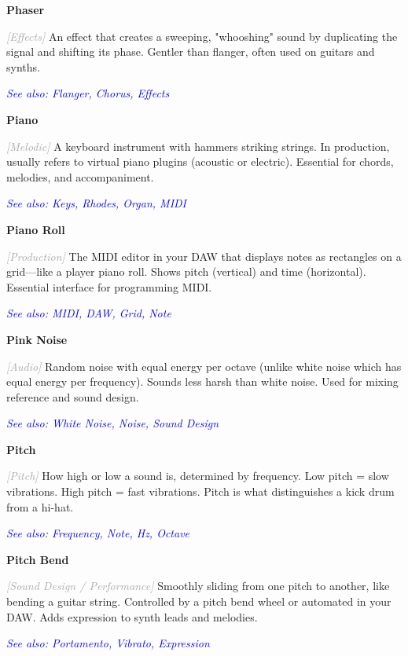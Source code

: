 \documentclass[11pt,letterpaper]{article}
\newcommand{\term}[1]{\textbf{\large\color{purple}#1}}
\newcommand{\category}[1]{\textcolor{darkgray}{\textit{\small [#1]}}}
\newcommand{\seealso}[1]{\textcolor{blue}{\textit{See also: #1}}}
\newenvironment{termdef}[1]
  {\noindent\term{#1}\par\nopagebreak}
  {\par\vspace{0.3em}}
\begin{document}
\begin{termdef}{Phaser}
\category{Effects}
An effect that creates a sweeping, "whooshing" sound by duplicating the signal and shifting its phase. Gentler than flanger, often used on guitars and synths.

\seealso{Flanger, Chorus, Effects}
\end{termdef}

\begin{termdef}{Piano}
\category{Melodic}
A keyboard instrument with hammers striking strings. In production, usually refers to virtual piano plugins (acoustic or electric). Essential for chords, melodies, and accompaniment.

\seealso{Keys, Rhodes, Organ, MIDI}
\end{termdef}

\begin{termdef}{Piano Roll}
\category{Production}
The MIDI editor in your DAW that displays notes as rectangles on a grid—like a player piano roll. Shows pitch (vertical) and time (horizontal). Essential interface for programming MIDI.

\seealso{MIDI, DAW, Grid, Note}
\end{termdef}

\begin{termdef}{Pink Noise}
\category{Audio}
Random noise with equal energy per octave (unlike white noise which has equal energy per frequency). Sounds less harsh than white noise. Used for mixing reference and sound design.

\seealso{White Noise, Noise, Sound Design}
\end{termdef}

\begin{termdef}{Pitch}
\category{Pitch}
How high or low a sound is, determined by frequency. Low pitch = slow vibrations. High pitch = fast vibrations. Pitch is what distinguishes a kick drum from a hi-hat.

\seealso{Frequency, Note, Hz, Octave}
\end{termdef}

\begin{termdef}{Pitch Bend}
\category{Sound Design / Performance}
Smoothly sliding from one pitch to another, like bending a guitar string. Controlled by a pitch bend wheel or automated in your DAW. Adds expression to synth leads and melodies.

\seealso{Portamento, Vibrato, Expression}
\end{termdef}
\end{document}
